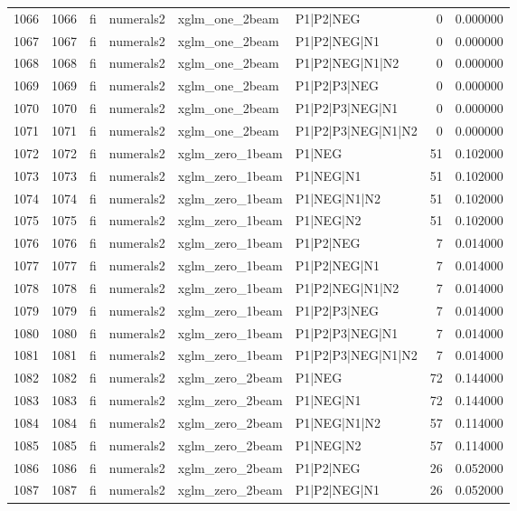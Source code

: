 \begin{tabular}{lrllllrr}
1066 & 1066 & fi & numerals2 & xglm_one_2beam & P1|P2|NEG & 0 & 0.000000 \\
1067 & 1067 & fi & numerals2 & xglm_one_2beam & P1|P2|NEG|N1 & 0 & 0.000000 \\
1068 & 1068 & fi & numerals2 & xglm_one_2beam & P1|P2|NEG|N1|N2 & 0 & 0.000000 \\
1069 & 1069 & fi & numerals2 & xglm_one_2beam & P1|P2|P3|NEG & 0 & 0.000000 \\
1070 & 1070 & fi & numerals2 & xglm_one_2beam & P1|P2|P3|NEG|N1 & 0 & 0.000000 \\
1071 & 1071 & fi & numerals2 & xglm_one_2beam & P1|P2|P3|NEG|N1|N2 & 0 & 0.000000 \\
1072 & 1072 & fi & numerals2 & xglm_zero_1beam & P1|NEG & 51 & 0.102000 \\
1073 & 1073 & fi & numerals2 & xglm_zero_1beam & P1|NEG|N1 & 51 & 0.102000 \\
1074 & 1074 & fi & numerals2 & xglm_zero_1beam & P1|NEG|N1|N2 & 51 & 0.102000 \\
1075 & 1075 & fi & numerals2 & xglm_zero_1beam & P1|NEG|N2 & 51 & 0.102000 \\
1076 & 1076 & fi & numerals2 & xglm_zero_1beam & P1|P2|NEG & 7 & 0.014000 \\
1077 & 1077 & fi & numerals2 & xglm_zero_1beam & P1|P2|NEG|N1 & 7 & 0.014000 \\
1078 & 1078 & fi & numerals2 & xglm_zero_1beam & P1|P2|NEG|N1|N2 & 7 & 0.014000 \\
1079 & 1079 & fi & numerals2 & xglm_zero_1beam & P1|P2|P3|NEG & 7 & 0.014000 \\
1080 & 1080 & fi & numerals2 & xglm_zero_1beam & P1|P2|P3|NEG|N1 & 7 & 0.014000 \\
1081 & 1081 & fi & numerals2 & xglm_zero_1beam & P1|P2|P3|NEG|N1|N2 & 7 & 0.014000 \\
1082 & 1082 & fi & numerals2 & xglm_zero_2beam & P1|NEG & 72 & 0.144000 \\
1083 & 1083 & fi & numerals2 & xglm_zero_2beam & P1|NEG|N1 & 72 & 0.144000 \\
1084 & 1084 & fi & numerals2 & xglm_zero_2beam & P1|NEG|N1|N2 & 57 & 0.114000 \\
1085 & 1085 & fi & numerals2 & xglm_zero_2beam & P1|NEG|N2 & 57 & 0.114000 \\
1086 & 1086 & fi & numerals2 & xglm_zero_2beam & P1|P2|NEG & 26 & 0.052000 \\
1087 & 1087 & fi & numerals2 & xglm_zero_2beam & P1|P2|NEG|N1 & 26 & 0.052000 \\

\end{tabular}
